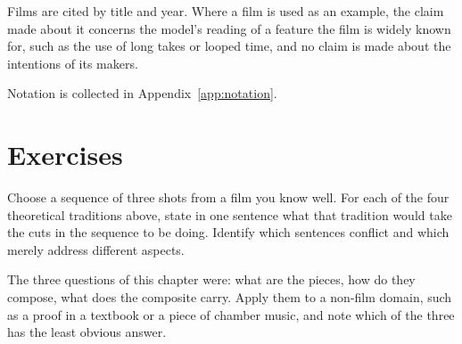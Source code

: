Films are cited by title and year. Where a film is used as an example, the claim made about it concerns the model's reading of a feature the film is widely known for, such as the use of long takes or looped time, and no claim is made about the intentions of its makers.

Notation is collected in Appendix~\ref{app:notation}.

\section*{Exercises}

\begin{exercise}
Choose a sequence of three shots from a film you know well. For each of the four theoretical traditions above, state in one sentence what that tradition would take the cuts in the sequence to be doing. Identify which sentences conflict and which merely address different aspects.
\end{exercise}

\begin{exercise}
The three questions of this chapter were: what are the pieces, how do they compose, what does the composite carry. Apply them to a non-film domain, such as a proof in a textbook or a piece of chamber music, and note which of the three has the least obvious answer.
\end{exercise}
